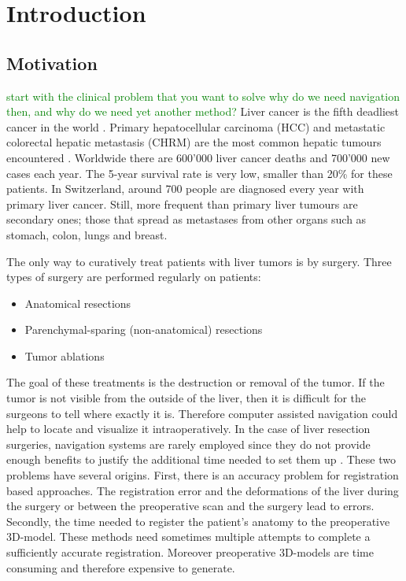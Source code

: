 %
%
%

\chapter{Introduction}
\section{Motivation} 
\textcolor{green}{start with the clinical problem that you want to solve}
\textcolor{green}{why do we need navigation then, and why do we need yet another method?}
Liver cancer is the fifth deadliest cancer in the world \cite{bray2018global}.
Primary hepatocellular carcinoma (HCC) and metastatic colorectal hepatic
metastasis (CHRM) are the most common hepatic tumours encountered \cite{north2014microwave}. Worldwide
there are 600'000 liver cancer deaths and 700'000 new cases each year.
The 5-year survival rate is very low, smaller than 20\% for these
patients. In Switzerland, around 700 people are diagnosed every year with
primary liver cancer. Still, more frequent than primary liver tumours are
secondary ones; those that spread as metastases from other organs such as stomach, colon,
lungs and breast. 

The only way to curatively treat patients with liver tumors is by surgery. Three types of surgery
are performed regularly on patients:
\begin{itemize}
  \item Anatomical resections
  \item Parenchymal-sparing (non-anatomical) resections
  \item Tumor ablations 
\end{itemize}
The goal of these treatments is the destruction or removal of the tumor. If the
tumor is not visible from the outside of the liver, then it is difficult for the
surgeons to tell where exactly it is. Therefore computer assisted navigation
could help to locate and visualize it intraoperatively.
In the case of liver resection surgeries, navigation systems are rarely employed
since they do not provide enough benefits to justify the additional time needed
to set them up \cite{beller2007image}. These two problems have several origins.
First, there is an accuracy problem for registration based approaches. The
registration error and the deformations of the liver during the surgery
\cite{clements2017deformation} or between the preoperative scan and the surgery
lead to errors. Secondly, the time needed to register the patient's anatomy to the
preoperative 3D-model. These methods need sometimes multiple attempts to complete
a sufficiently accurate registration. Moreover preoperative 3D-models are time
consuming and therefore expensive to generate.


